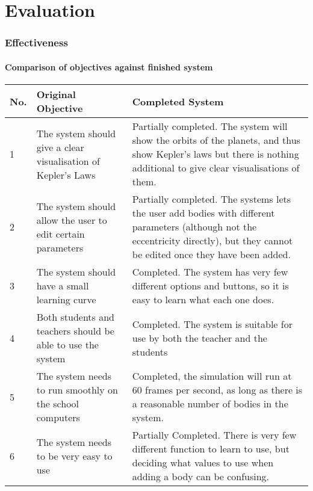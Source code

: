 \part{Evaluation}

%
%
%
%

\section{Effectiveness}
\subsection{Comparison of objectives against finished system}
\begin{tabular}{p{}p{}p{}}
	No. & Original Objective & Completed System \\\hline
	1 & The system should give a clear visualisation of Kepler's Laws &
	Partially completed. The system will show the orbits of the planets, and
	thus show Kepler's laws but there is nothing additional to give clear
	visualisations of them.\\
	2 & The system should allow the user to edit certain parameters &
	Partially completed. The systems lets the user add bodies with different
	parameters (although not the eccentricity directly), but they cannot be
	edited once they have been added. \\
	3 & The system should have a small learning curve & Completed. The
	system has very few different options and buttons, so it is easy to
	learn what each one does. \\
	4 & Both students and teachers should be able to use the system &
	Completed. The system is suitable for use by both the teacher and the
	students \\
	5 &The system needs to run smoothly on the school computers & Completed,
	the simulation will run at 60 frames per second, as long as there is a
	reasonable number of bodies in the system.\\
	6 & The system needs to be very easy to use & Partially Completed. There
	is very few different function to learn to use, but deciding what values
	to use when adding a body can be confusing.\\
\end{tabular}

